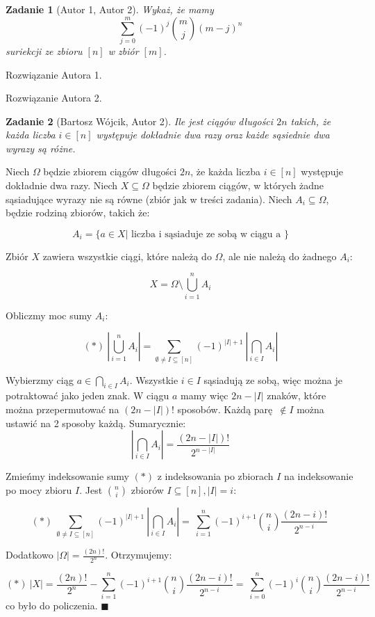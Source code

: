 \documentclass{mwart}
\newtheorem{zad}{Zadanie}[section]
\begin{document}
\begin{zad}[Autor 1, Autor 2]
    Wykaż, że mamy
    \[
        \sum_{j=0}^{m}(-1)^j \binom{m}{j}(m-j)^n
    \]
    suriekcji ze zbioru $[n]$ w zbiór $[m]$.
\end{zad}
\begin{mdframed}
    Rozwiązanie Autora 1.
\end{mdframed}
\begin{mdframed}
    Rozwiązanie Autora 2.
\end{mdframed}



\begin{zad}[Bartosz Wójcik, Autor 2]
    Ile jest ciągów długości $2n$ takich, że każda liczba $i \in [n]$
    występuje dokładnie dwa razy oraz każde sąsiednie dwa wyrazy są różne.
\end{zad}

\begin{mdframed}

    Niech $\Omega$ będzie zbiorem ciągów długości $2n$, że każda liczba $i \in [n]$
    występuje dokładnie dwa razy.
    Niech $X \subseteq \Omega$ będzie zbiorem ciągów, w których żadne sąsiadujące wyrazy
    nie są równe (zbiór jak w treści zadania).
    Niech $A_i \subseteq \Omega$, będzie rodziną zbiorów,
    takich że:

    $$ A_i = \{a \in X \vert\text{ liczba i sąsiaduje ze sobą w ciągu a }\} $$

    Zbiór $X$ zawiera wszystkie ciągi, które należą do $\Omega$, ale nie należą do żadnego
    $A_i$:

    $$ X = \Omega \setminus \bigcup_{i = 1}^{n} A_i$$

    Obliczmy moc sumy $A_i$:

    $$ (*) \
        |\bigcup_{i = 1}^{n} A_i| = \sum_{\emptyset\neq I \subseteq [n]} (-1)^{|I| + 1} \
        |\bigcap_{i \in I} A_i|
    $$

    Wybierzmy ciąg $a \in \bigcap_{i \in I} A_i$. Wszystkie $i \in I$ sąsiadują ze sobą,
    więc można je potraktować jako jeden znak. W ciągu $a$ mamy więc $2n - |I|$ znaków,
    które można przepermutować na $(2n - |I|)!$ sposobów. Każdą parę $\notin I$ można ustawić na 2
    sposoby każdą. Sumarycznie:
    $$\
        |\bigcap_{i \in I} A_i| = \frac{(2n - |I|)!}{2^{n - |I|}}\
    $$

    Zmieńmy indeksowanie sumy $(*)$ z indeksowania po zbiorach $I$ na indeksowanie po mocy zbioru $I$.
    Jest $\binom{n}{i}$ zbiorów $I \subseteq [n], |I| = i$:

    $$(*)\
        \sum_{\emptyset\neq I \subseteq [n]} (-1)^{|I| + 1} \
        |\bigcap_{i \in I} A_i| = \
        \sum_{i = 1}^{n} (-1)^{i + 1} \binom{n}{i} \frac{(2n - i)!}{2^{n - i}}\
    $$

    Dodatkowo $|\Omega| = \frac{(2n)!}{2^{n}}$. Otrzymujemy:

    $$(*)\
        |X| = \frac{(2n)!}{2^{n}} - \sum_{i = 1}^{n} (-1)^{i + 1} \binom{n}{i} \frac{(2n - i)!}{2^{n - i}} = \
        \sum_{i = 0}^{n} (-1)^{i} \binom{n}{i} \frac{(2n - i)!}{2^{n - i}} \
    $$
    co było do policzenia. $\blacksquare$


\end{mdframed}
\end{document}
